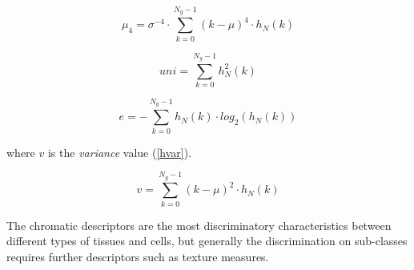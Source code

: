 \documentclass[final,a4paper,12pt,english]{UnicaPhdThesis3}
\begin{document}
	\begin{equation}\label{hkurt}
	\mu_4 =\sigma^{-4} \cdot \sum_{k=0}^{N_{g}-1} (k - \mu)^4 \cdot h_N(k)
	\end{equation}
	
	\begin{equation}\label{huni}
	uni=\sum_{k=0}^{N_{g}-1} h_N ^2 (k)
	\end{equation}
	
	\begin{equation}\label{hent}
	e=-\sum_{k=0}^{N_{g}-1}  h_N(k) \cdot  log_2(h_N(k))
	\end{equation}
	
	where $v$ is the \textit{variance} value (\ref{hvar}). 
	
	\begin{equation}\label{hvar}
	v=\sum_{k=0}^{N_{g}-1} (k - \mu)^2 \cdot h_N(k)
	\end{equation}
	
	The chromatic descriptors are the most discriminatory characteristics between different types of tissues and cells, but generally the discrimination on sub-classes requires further descriptors such as texture measures.
	
\end{document}
